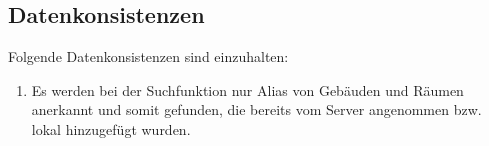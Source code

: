 \subsection{Datenkonsistenzen}

Folgende Datenkonsistenzen sind einzuhalten:
\begin{enumerate}[label=\textbf{/T\arabic*0/}, align=left, resume]
	\item Es werden bei der Suchfunktion nur Alias von Gebäuden und Räumen anerkannt und somit gefunden, die bereits vom Server angenommen bzw. lokal hinzugefügt wurden.
\end{enumerate}